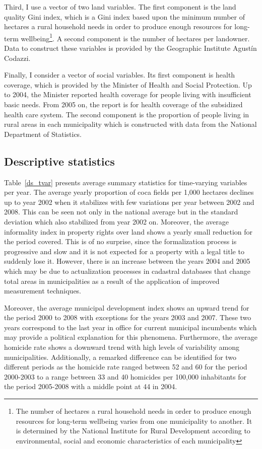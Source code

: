 \documentclass[a4paper, 12pt]{article}
\begin{document}
Third, I use a vector of two land variables. The first component is the land quality Gini index, which is a Gini index based upon the minimum number of hectares a rural household needs in order to produce enough resources for long-term wellbeing\footnote{The number of hectares a rural household needs in order to produce enough resources for long-term wellbeing varies from one municipality to another. It is determined by the National Institute for Rural Development according to environmental, social and economic characteristics of each municipality}. A second component is the number of hectares per landowner. Data to construct these variables is provided by the Geographic Institute Agust\'{i}n Codazzi.

Finally, I consider a vector of social variables. Its first component is health coverage, which is provided by the Minister of Health and Social Protection. Up to 2004, the Minister reported health coverage for people living with insufficient basic needs. From 2005 on, the report is for health coverage of the subsidized health care system. The second component is the proportion of people living in rural areas in each municipality which is constructed with data from the National Department of Statistics.

\subsection{Descriptive statistics}
\label{descriptive}

Table~\ref{ds_tvar} presents average summary statistics for time-varying variables per year. The average yearly proportion of coca fields per 1,000 hectares declines up to year 2002 when it stabilizes with few variations per year between 2002 and 2008. This can be seen not only in the national average but in the standard deviation which also stabilized from year 2002 on. Moreover, the average informality index in property rights over land shows a yearly small reduction for the period covered. This is of no surprise, since the formalization process is progressive and slow and it is not expected for a property with a legal title to suddenly lose it. However, there is an increase between the years 2004 and 2005 which may be due to actualization processes in cadastral databases that change total areas in municipalities as a result of the application of improved measurement techniques.

Moreover, the average municipal development index shows an upward trend for the period 2000 to 2008 with exceptions for the years 2003 and 2007. These two years correspond to the last year in office for current municipal incumbents which may provide a political explanation for this phenomena. Furthermore, the average homicide rate shows a downward trend with high levels of variability among municipalities. Additionally, a remarked difference can be identified for two different periods as the homicide rate ranged between 52 and 60 for the period 2000-2003 to a range between 33 and 40 homicides per 100,000 inhabitants for the period 2005-2008 with a middle point at 44 in 2004.
\end{document}
